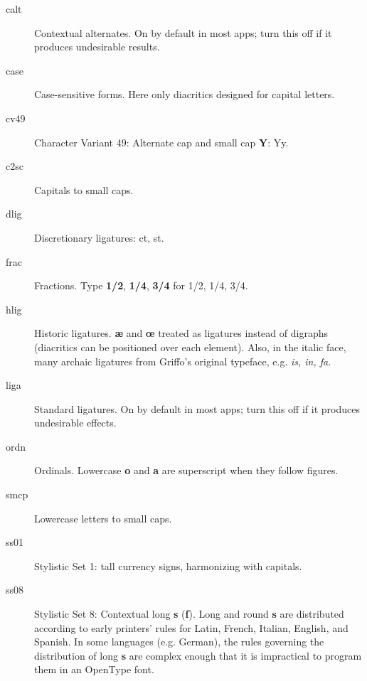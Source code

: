 \documentclass[12pt]{book}
\begin{document}
\small
\begin{description}

\item[calt] Contextual alternates. On by default in most apps; turn
  this off if it produces undesirable results.

\item[case] Case-sensitive forms. Here only diacritics designed for
  capital letters.

\item[cv49] Character Variant 49: Alternate cap and small cap \textbf{Y}: {Yy}.

\item[c2sc] Capitals to small caps.

\item[dlig] Discretionary ligatures:
  {ct, st}.

\item[frac] Fractions. Type \textbf{1/2}, \textbf{1/4}, \textbf{3/4} for
  {1/2, 1/4, 3/4}.

\item[hlig] Historic ligatures.  \textbf{æ} and \textbf{œ} treated as ligatures instead
  of digraphs (diacritics can be positioned over each element). Also, in the italic face, many archaic ligatures from
  Griffo's original typeface,
  e.g. \textit{is, in, fa}.

\item[liga] Standard ligatures. On by default in most apps; turn this
  off if it produces undesirable effects.

\item[ordn] Ordinals. Lowercase \textbf{o} and \textbf{a} are superscript when they
  follow figures.

\item[smcp] Lowercase letters to small caps.

\item[ss01] Stylistic Set 1: tall currency signs, harmonizing with capitals.

\item[ss08] Stylistic Set 8: Contextual long \textbf{s} (\textbf{ſ}\kern3pt). Long and round \textbf{s} are
  distributed according to early printers' rules for Latin, French,
  Italian, English, and Spanish. In some languages (e.g. German), the
  rules governing the distribution of long \textbf{s} are complex enough that
  it is impractical to program them in an OpenType font.


\end{description}
\end{document}

